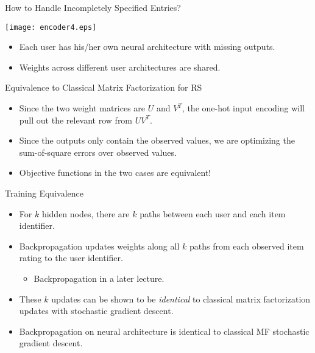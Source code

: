 \begin{frame}{How to Handle Incompletely Specified Entries?}
\begin{center}
\texttt{[image: encoder4.eps]}
\end{center}
\begin{itemize}
\item Each user has his/her own neural architecture with missing
outputs.
\item Weights across different user architectures are shared.
\end{itemize}
\end{frame}


\begin{frame}{Equivalence to Classical Matrix Factorization for RS}
\begin{itemize}
\item Since the two weight matrices are $U$ and $V^T$, the one-hot
input encoding will pull out the relevant row from $U V^T$.
\item Since the outputs only contain the observed values, we are
optimizing the sum-of-square errors over observed values.
\item Objective functions in the two cases are equivalent!
\end{itemize}
\end{frame}


\begin{frame}{Training Equivalence}
\begin{itemize}
\item For $k$ hidden nodes, there are $k$ paths between each user
and each item identifier. \item Backpropagation updates weights
along all $k$ paths from each observed item rating to the user
identifier.
\begin{itemize}
\item Backpropagation in a later lecture.
\end{itemize}
\item These $k$ updates can be shown to be {\em identical} to
classical matrix factorization updates with stochastic gradient
descent.
\item Backpropagation on neural architecture is identical to
classical MF stochastic gradient descent.
\end{itemize}
\end{frame}


